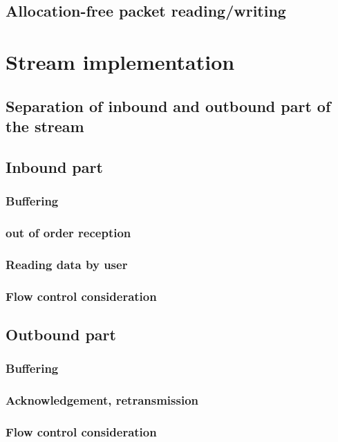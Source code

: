 \subsection{Allocation-free packet reading/writing}


\section{Stream implementation}

\subsection{Separation of inbound and outbound part of the stream}
\subsection{Inbound part}


\subsubsection{Buffering}
\subsubsection{out of order reception}
\subsubsection{Reading data by user}
\subsubsection{Flow control consideration}


\subsection{Outbound part}

\subsubsection{Buffering}
\subsubsection{Acknowledgement, retransmission}
\subsubsection{Flow control consideration}

